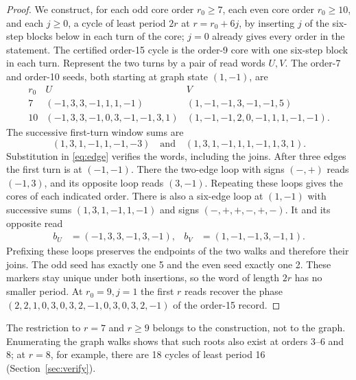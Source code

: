\documentclass[11pt]{amsart}
\theoremstyle{definition}
\begin{document}
\begin{proof}
We construct, for each odd core order \(r_0\ge7\), each even core order
\(r_0\ge10\), and each \(j\ge0\), a cycle of least period \(2r\) at
\(r=r_0+6j\), by inserting \(j\) of the six-step blocks below in each
turn of the core; \(j=0\) already gives every order in the statement.
The certified order-15 cycle is the order-9 core with one six-step block
in each turn.
Represent the two turns by a pair of read words \(U,V\).
The order-7 and order-10 seeds, both starting at graph
state \((1,-1)\), are
\[
\begin{array}{r|l|l}
r_0&U&V\\ \hline
7&(-1,3,3,-1,1,1,-1)&(1,-1,-1,3,-1,-1,5)\\
10&(-1,3,3,-1,0,3,-1,-1,3,1)&(1,-1,-1,2,0,-1,1,1,-1,-1).
\end{array}
\]
The successive first-turn window sums are
\[
 (1,3,1,-1,1,-1,-3)\quad\text{and}\quad
 (1,3,1,-1,1,1,-1,1,3,1).
\]
Substitution in \eqref{eq:edge} verifies the words,
including the joins.
After three edges the first turn is at \((-1,-1)\).
There the two-edge loop with signs \((-,+)\) reads
\((-1,3)\), and its opposite loop reads \((3,-1)\).
Repeating these loops gives the cores of each indicated
order. There is also a six-edge loop at \((1,-1)\)
with successive sums \((1,3,1,-1,1,-1)\) and signs
\((-,+,+,-,+,-)\). It and its opposite read
\[
 \begin{aligned}
 b_U&=(-1,3,3,-1,3,-1), & b_V&=(1,-1,-1,3,-1,1).
 \end{aligned}
\]
Prefixing these loops preserves the endpoints of the two
walks and therefore their joins.
The odd seed has exactly one 5 and the even seed exactly
one 2. These markers stay unique under both insertions,
so the word of length \(2r\) has no smaller period.
At \(r_0=9,j=1\) the first \(r\) reads recover the phase
\((2,2,1,0,3,0,3,2,-1,0,3,0,3,2,-1)\) of the order-15 record.
\end{proof}

The restriction to \(r=7\) and \(r\ge9\) belongs to the construction,
not to the graph. Enumerating the graph walks shows that such roots also
exist at orders 3--6 and 8; at \(r=8\), for example, there are 18 cycles
of least period 16 (Section~\ref{sec:verify}).
\end{document}
